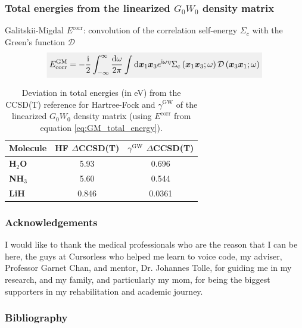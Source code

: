 \documentclass{beamer}
\newcommand{\highlight}[1]{\colorbox{caltechgray!10}{$\displaystyle#1$}}
\begin{document}
\begin{frame}
    \frametitle{\textcolor{caltechorange}{Total energies from the linearized $G_0W_0$ density matrix}}
{Galitskii-Migdal $E^{\mathrm{corr}}$}: convolution of the correlation self-energy $\Sigma _c$ with the Green's function $\mathcal{D}$
\begin{equation}
    \highlight{E_{\mathrm{corr}}^{\mathrm{GM}}=-\frac{\mathrm{i}}{2} \int_{-\infty}^{\infty} \frac{\mathrm{d} \omega}{2 \pi} \int \mathrm{d} \boldsymbol{x}_1 \boldsymbol{x}_3 e^{\mathrm{i} \omega \eta} \Sigma_{\mathrm{c}}\left(\boldsymbol{x}_1 \boldsymbol{x}_3 ; \omega\right) \mathcal{D}\left(\boldsymbol{x}_3 \boldsymbol{x}_1 ; \omega\right)}
\label{eq:GM_total_energy}
\end{equation}
\begin{table}[h!]
    \centering
    \caption{Deviation in total energies (in eV) {from the CCSD(T) reference} for Hartree-Fock and $\gamma ^{\mathrm{GW}}$ of the linearized $G_0W_0$ density matrix (using $E^{\mathrm{corr}}$ from equation \ref{eq:GM_total_energy}).}
    \begin{tabular}{|l|c|c|}
        \hline
        \textbf{Molecule} & \textbf{HF $\Delta $CCSD(T)} & \textbf{$\gamma ^{\mathrm{GW}}$ $\Delta $CCSD(T)} \\
        \hline
        \textbf{H$_2$O} & 5.93 & 0.696 \\
        \hline
        \textbf{NH$_3$} & 5.60 & 0.544 \\
        \hline
        \textbf{LiH} & 0.846 & 0.0361 \\
        \hline
    \end{tabular}
    \label{tab:total_energy_gm_ev}
    \vspace{-10pt}
\end{table}



\end{frame}
\begin{frame}
    \frametitle{\textcolor{caltechorange}{Acknowledgements}}
    I would like to thank the medical professionals who are the reason that I can be here, the guys at Cursorless who helped me learn to voice code, my adviser, Professor Garnet Chan, and mentor, Dr. Johannes Tolle, for guiding me in my research, and my family, and particularly my mom, for being the biggest supporters in my rehabilitation and academic journey.
\end{frame}





\begin{frame}
    \frametitle{\textcolor{caltechorange}{Bibliography}}
    \printbibliography
\end{frame}
\end{document}
